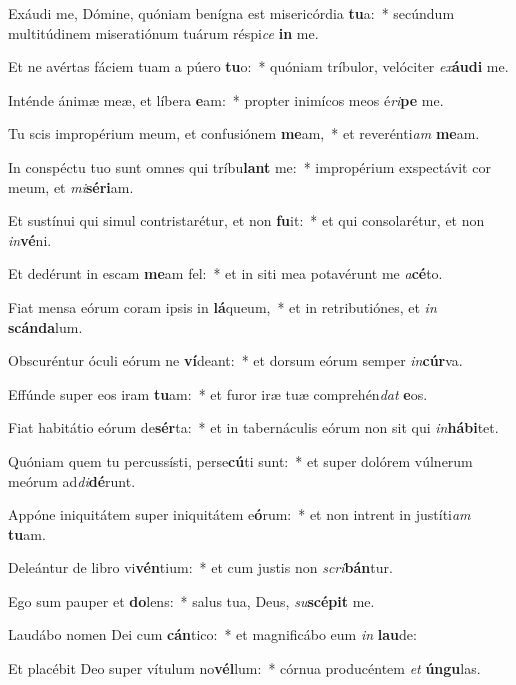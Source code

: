 \item Exáudi me, Dómine, quóniam benígna est misericórdia \textbf{tu}a:~* secúndum multitúdinem miseratiónum tuárum réspi\textit{ce} \textbf{in} me.
\item Et ne avértas fáciem tuam a púero \textbf{tu}o:~* quóniam tríbulor, velóciter \textit{ex}\textbf{áu}\textbf{di} me.
\item Inténde ánimæ meæ, et líbera \textbf{e}am:~* propter inimícos meos é\textit{ri}\textbf{pe} me.
\item Tu scis impropérium meum, et confusiónem \textbf{me}am,~* et reverénti\textit{am} \textbf{me}am.
\item In conspéctu tuo sunt omnes qui tríbu\textbf{lant} me:~* impropérium exspectávit cor meum, et \textit{mi}\textbf{sé}\textbf{ri}am.
\item Et sustínui qui simul contristarétur, et non \textbf{fu}it:~* et qui consolarétur, et non \textit{in}\textbf{vé}ni.
\item Et dedérunt in escam \textbf{me}am fel:~* et in siti mea potavérunt me \textit{a}\textbf{cé}to.
\item Fiat mensa eórum coram ipsis in \textbf{lá}queum,~* et in retributiónes, et \textit{in} \textbf{scán}\textbf{da}lum.
\item Obscuréntur óculi eórum ne \textbf{ví}deant:~* et dorsum eórum semper \textit{in}\textbf{cúr}va.
\item Effúnde super eos iram \textbf{tu}am:~* et furor iræ tuæ comprehén\textit{dat} \textbf{e}os.
\item Fiat habitátio eórum de\textbf{sér}ta:~* et in tabernáculis eórum non sit qui \textit{in}\textbf{há}\textbf{bi}tet.
\item Quóniam quem tu percussísti, perse\textbf{cú}ti sunt:~* et super dolórem vúlnerum meórum ad\textit{di}\textbf{dé}runt.
\item Appóne iniquitátem super iniquitátem e\textbf{ó}rum:~* et non intrent in justíti\textit{am} \textbf{tu}am.
\item Deleántur de libro vi\textbf{vén}tium:~* et cum justis non \textit{scri}\textbf{bán}tur.
\item Ego sum pauper et \textbf{do}lens:~* salus tua, Deus, \textit{su}\textbf{scé}\textbf{pit} me.
\item Laudábo nomen Dei cum \textbf{cán}tico:~* et magnificábo eum \textit{in} \textbf{lau}de:
\item Et placébit Deo super vítulum no\textbf{vél}lum:~* córnua producéntem \textit{et} \textbf{ún}\textbf{gu}las.
